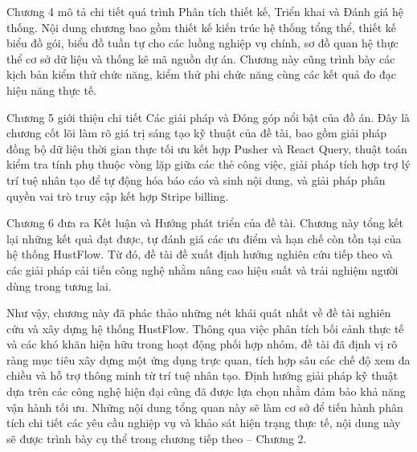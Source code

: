 \documentclass[../DoAn.tex]{subfiles}
\begin{document}
Chương 4 mô tả chi tiết quá trình Phân tích thiết kế, Triển khai và Đánh giá hệ thống. Nội dung chương bao gồm thiết kế kiến trúc hệ thống tổng thể, thiết kế biểu đồ gói, biểu đồ tuần tự cho các luồng nghiệp vụ chính, sơ đồ quan hệ thực thể cơ sở dữ liệu và thống kê mã nguồn dự án. Chương này cũng trình bày các kịch bản kiểm thử chức năng, kiểm thử phi chức năng cùng các kết quả đo đạc hiệu năng thực tế.

Chương 5 giới thiệu chi tiết Các giải pháp và Đóng góp nổi bật của đồ án. Đây là chương cốt lõi làm rõ giá trị sáng tạo kỹ thuật của đề tài, bao gồm giải pháp đồng bộ dữ liệu thời gian thực tối ưu kết hợp Pusher và React Query, thuật toán kiểm tra tính phụ thuộc vòng lặp giữa các thẻ công việc, giải pháp tích hợp trợ lý trí tuệ nhân tạo để tự động hóa báo cáo và sinh nội dung, và giải pháp phân quyền vai trò truy cập kết hợp Stripe billing.

Chương 6 đưa ra Kết luận và Hướng phát triển của đề tài. Chương này tổng kết lại những kết quả đạt được, tự đánh giá các ưu điểm và hạn chế còn tồn tại của hệ thống HustFlow. Từ đó, đề tài đề xuất định hướng nghiên cứu tiếp theo và các giải pháp cải tiến công nghệ nhằm nâng cao hiệu suất và trải nghiệm người dùng trong tương lai.

Như vậy, chương này đã phác thảo những nét khái quát nhất về đề tài nghiên cứu và xây dựng hệ thống HustFlow. Thông qua việc phân tích bối cảnh thực tế và các khó khăn hiện hữu trong hoạt động phối hợp nhóm, đề tài đã định vị rõ ràng mục tiêu xây dựng một ứng dụng trực quan, tích hợp sâu các chế độ xem đa chiều và hỗ trợ thông minh từ trí tuệ nhân tạo. Định hướng giải pháp kỹ thuật dựa trên các công nghệ hiện đại cũng đã được lựa chọn nhằm đảm bảo khả năng vận hành tối ưu. Những nội dung tổng quan này sẽ làm cơ sở để tiến hành phân tích chi tiết các yêu cầu nghiệp vụ và khảo sát hiện trạng thực tế, nội dung này sẽ được trình bày cụ thể trong chương tiếp theo – Chương 2.
\end{document}
